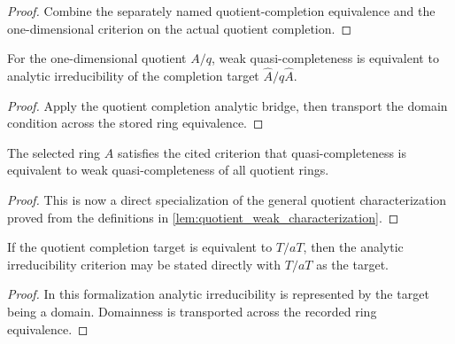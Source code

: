 \begin{proof}
  Combine the separately named quotient-completion equivalence and the
  one-dimensional criterion on the actual quotient completion.
\end{proof}

\begin{lemma}
  \label{lem:quotient_analytic_criterion_on_completed_quotient_source}
  For the one-dimensional quotient \(A/q\), weak quasi-completeness is
  equivalent to analytic irreducibility of the completion target
  \(\widehat A/q\widehat A\).
\end{lemma}

\begin{proof}
  Apply the quotient completion analytic bridge, then transport the domain
  condition across the stored ring equivalence.
\end{proof}

\begin{lemma}
  \label{lem:all_quotients_weak_criterion_source}
  The selected ring \(A\) satisfies the cited criterion that quasi-completeness
  is equivalent to weak quasi-completeness of all quotient rings.
\end{lemma}

\begin{proof}
  This is now a direct specialization of the general quotient characterization
  proved from the definitions in
  \cref{lem:quotient_weak_characterization}.
\end{proof}

\begin{lemma}
  \label{lem:quotient_completion_dimension_criterion}
  If the quotient completion target is equivalent to \(T/aT\), then the
  analytic irreducibility criterion may be stated directly with \(T/aT\) as
  the target.
\end{lemma}

\begin{proof}
  In this formalization analytic irreducibility is represented by the target
  being a domain.  Domainness is transported across the recorded ring
  equivalence.
\end{proof}

